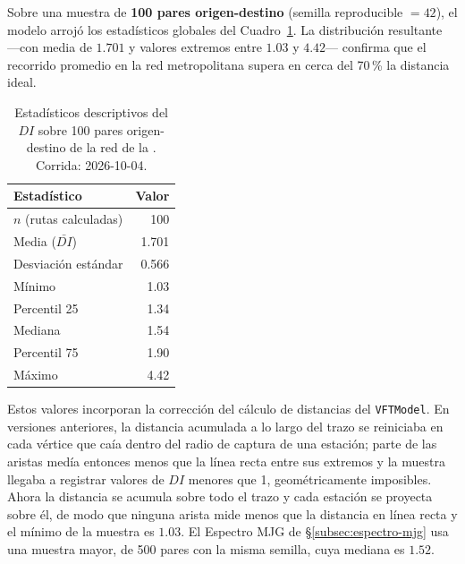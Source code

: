Sobre una muestra de \textbf{100 pares origen-destino} (semilla reproducible
$= 42$), el modelo arrojó los estadísticos globales del
Cuadro~\ref{tab:di-estadisticas}. La distribución resultante —con media de $1.701$ y
valores extremos entre $1.03$ y $4.42$— confirma que el recorrido promedio en la
red metropolitana supera en cerca del 70\,\% la distancia ideal.

\begin{table}[H]
    \centering
    \caption[Estadísticos globales del Factor de Desviación]{%
    Estadísticos descriptivos del $DI$ sobre 100 pares
    origen-destino de la red de la \zmvm{}.
    Corrida: 2026-10-04.}
    \label{tab:di-estadisticas}
    \begin{tabular}{|l|r|}
        \hline
        \textbf{Estadístico} & \textbf{Valor} \\
        \hline
        $n$ (rutas calculadas)     & 100   \\
        Media ($\bar{DI}$)         & 1.701 \\
        Desviación estándar        & 0.566 \\
        Mínimo                     & 1.03  \\
        Percentil 25               & 1.34  \\
        Mediana                    & 1.54  \\
        Percentil 75               & 1.90  \\
        Máximo                     & 4.42  \\
        \hline
    \end{tabular}
\end{table}

Estos valores incorporan la corrección del cálculo de distancias del
\texttt{VFTModel}. En versiones anteriores, la distancia acumulada a lo largo
del trazo se reiniciaba en cada vértice que caía dentro del radio de captura de
una estación; parte de las aristas medía entonces menos que la línea recta entre
sus extremos y la muestra llegaba a registrar valores de $DI$ menores que 1,
geométricamente imposibles. Ahora la distancia se acumula sobre todo el trazo y
cada estación se proyecta sobre él, de modo que ninguna arista mide menos que la
distancia en línea recta y el mínimo de la muestra es $1.03$. El Espectro MJG de
§\ref{subsec:espectro-mjg} usa una muestra mayor, de 500 pares con la misma
semilla, cuya mediana es $1.52$.

